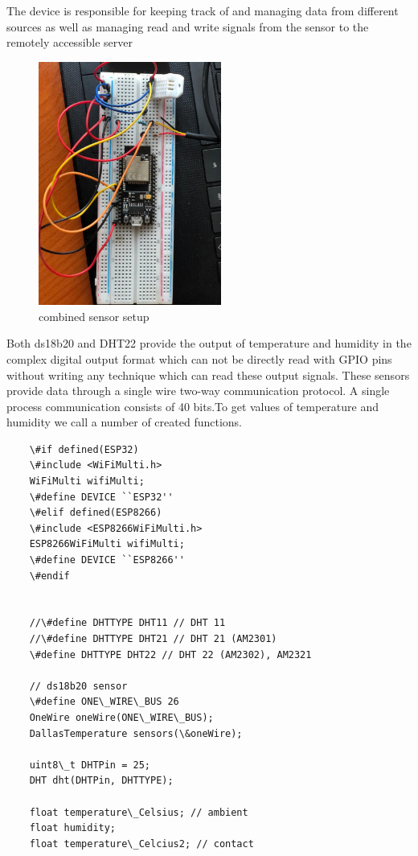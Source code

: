 The device is responsible for keeping track of and managing data from different sources as well as managing read and write signals from the sensor to the remotely accessible server  
\begin{figure}[!h]
	\centering
	\includegraphics[width=0.7\linewidth, height = 8cm]{Figures/setup}
	\caption{combined sensor setup}
	
\end{figure}
Both ds18b20 and DHT22 provide the output of temperature and humidity in the complex digital output format which can not be directly read with GPIO pins without writing any technique which can read these output signals. These sensors provide data through a single wire two-way communication protocol. A single process communication consists of 40 bits.To get values of temperature and humidity we call a number of created  functions.



\begin{lstlisting}
	\#if defined(ESP32)
	\#include <WiFiMulti.h>
	WiFiMulti wifiMulti;
	\#define DEVICE ``ESP32''
	\#elif defined(ESP8266)
	\#include <ESP8266WiFiMulti.h>
	ESP8266WiFiMulti wifiMulti;
	\#define DEVICE ``ESP8266''
	\#endif
	

	//\#define DHTTYPE DHT11 // DHT 11
	//\#define DHTTYPE DHT21 // DHT 21 (AM2301)
	\#define DHTTYPE DHT22 // DHT 22 (AM2302), AM2321
	
	// ds18b20 sensor
	\#define ONE\_WIRE\_BUS 26
	OneWire oneWire(ONE\_WIRE\_BUS);
	DallasTemperature sensors(\&oneWire);
	
	uint8\_t DHTPin = 25;
	DHT dht(DHTPin, DHTTYPE);
	
	float temperature\_Celsius; // ambient
	float humidity;
	float temperature\_Celcius2; // contact
\end{lstlisting}


